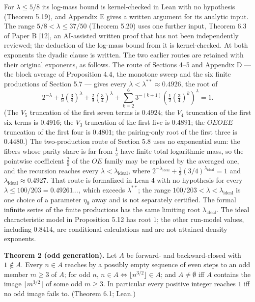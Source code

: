 \documentclass[11pt,a4paper]{article}
\begin{document}
For \(\lambda\le5/8\) its log-mass bound is kernel-checked in Lean with
no hypothesis (Theorem 5.19), and Appendix E gives a written argument
for its analytic input. The range \(5/8<\lambda\le37/50\) (Theorem 5.20)
uses one further input, Theorem 6.3 of Paper B {[}12{]}, an AI-assisted
written proof that has not been independently reviewed; the deduction of
the log-mass bound from it is kernel-checked. At both exponents the
dyadic clause is written. The two earlier routes are retained with their
original exponents, as follows. The route of Sections 4--5 and Appendix
D --- the block average of Proposition 4.4, the monotone sweep and the
six finite productions of Section 5.7 --- gives every
\(\lambda<\lambda^{**}\approx0.4926\), the root of \[
2^{-\lambda}+\tfrac19(\tfrac38)^\lambda+\tfrac29(\tfrac34)^\lambda
 +\sum_{k=2}^{6}3^{-(k+1)}\left(\tfrac12(\tfrac34)^k\right)^\lambda=1.
\tag{1.1}
\] (The \(V_5\) truncation of the first seven terms is \(0.4924\); the
\(V_4\) truncation of the first six terms is \(0.4916\); the \(V_3\)
truncation of the first five is \(0.4891\); the \(OEOEE\) truncation of
the first four is \(0.4801\); the pairing-only root of the first three
is \(0.4480\).) The two-production route of Section 5.8 uses no
exponential sum: the fibers whose parity share is far from \(\tfrac12\)
have finite total logarithmic mass, so the pointwise coefficient
\(\tfrac29\) of the \(OE\) family may be replaced by the averaged one,
and the recursion reaches every \(\lambda<\lambda_{\mathrm{ideal}}\),
where
\(2^{-\lambda_{\mathrm{ideal}}}+\tfrac13(3/4)^{\lambda_{\mathrm{ideal}}}=1\)
and \(\lambda_{\mathrm{ideal}}\approx0.4927\). That route is formalized
in Lean 4 with no hypothesis for every
\(\lambda\le100/203=0.49261\ldots\), which exceeds \(\lambda^{**}\); the
range \(100/203<\lambda<\lambda_{\mathrm{ideal}}\) is one choice of a
parameter \(\eta_0\) away and is not separately certified. The formal
infinite series of the finite productions has the same limiting root
\(\lambda_{\mathrm{ideal}}\). The ideal characteristic model in
Proposition 5.12 has root \(1\); the other run-model values, including
\(0.8414\), are conditional calculations and are not attained density
exponents.

\textbf{Theorem 2 (odd generation).} Let \(A\) be forward- and
backward-closed with \(1\notin A\). Every \(n\in A\) reaches by a
possibly empty sequence of even steps to an odd member \(m\ge 3\) of
\(A\); for odd \(n\), \(n\in A\iff\lfloor n^{3/2}\rfloor\in A\); and
\(A\ne\emptyset\) iff \(A\) contains the image
\(\lfloor m^{3/2}\rfloor\) of some odd \(m\ge 3\). In particular every
positive integer reaches \(1\) iff no odd image fails to. (Theorem 6.1;
Lean.)
\end{document}
